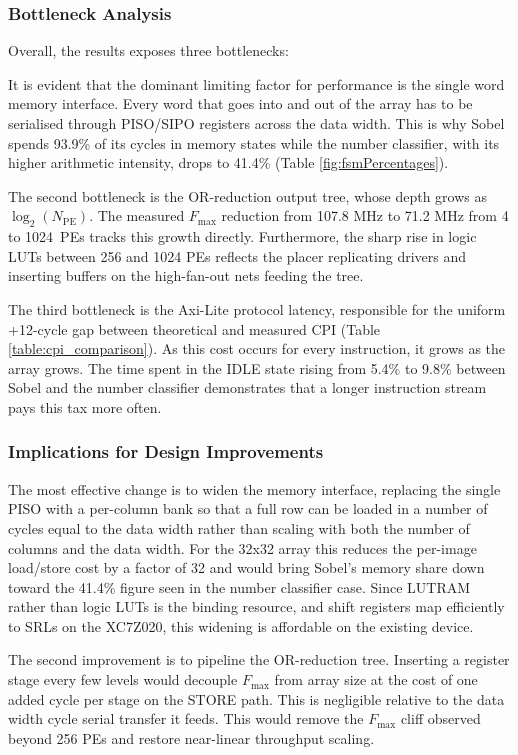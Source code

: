     \subsubsection{Bottleneck Analysis} \label{sec:bottleneck}
    Overall, the results exposes three bottlenecks:

    It is evident that the dominant limiting factor for performance is the single word memory interface. Every word that goes into and out of the array has to be serialised through PISO/SIPO registers across the data width. This is why Sobel spends 93.9\% of its cycles in memory states while the number classifier, with its higher arithmetic intensity, drops to 41.4\% (Table \ref{fig:fsmPercentages}).
    
    The second bottleneck is the OR-reduction output tree, whose depth grows as $\log_2(N_\text{PE})$. The measured $F_\mathrm{max}$ reduction from 107.8 MHz to 71.2 MHz from 4 to 1024~PEs tracks this growth directly. Furthermore, the sharp rise in logic LUTs between 256 and 1024 PEs reflects the placer replicating drivers and inserting buffers on the high-fan-out nets feeding the tree.
    
    The third bottleneck is the Axi-Lite protocol latency, responsible for the uniform +12-cycle gap between theoretical and measured CPI (Table \ref{table:cpi_comparison}). As this cost occurs for every instruction, it grows as the array grows. The time spent in the IDLE state rising from 5.4\% to 9.8\% between Sobel and the number classifier demonstrates that a longer instruction stream pays this tax more often.
    
    \subsubsection{Implications for Design Improvements}
    The most effective change is to widen the memory interface, replacing the single PISO with a per-column bank so that a full row can be loaded in a number of cycles equal to the data width rather than scaling with both the number of columns and the data width. For the 32x32 array this reduces the per-image load/store cost by a factor of 32 and would bring Sobel's memory share down toward the 41.4\% figure seen in the number classifier case. Since LUTRAM rather than logic LUTs is the binding resource, and shift registers map efficiently to SRLs on the XC7Z020, this widening is affordable on the existing device.
    
    The second improvement is to pipeline the OR-reduction tree. Inserting a register stage every few levels would decouple $F_\mathrm{max}$ from array size at the cost of one added cycle per stage on the STORE path. This is negligible relative to the data width cycle serial transfer it feeds. This would remove the $F_\mathrm{max}$ cliff observed beyond 256 PEs and restore near-linear throughput scaling.
    
